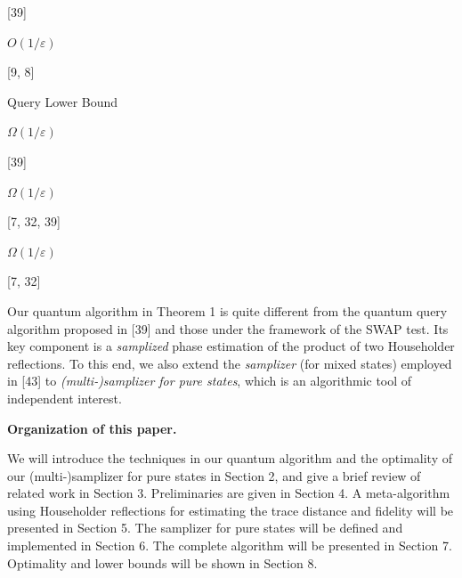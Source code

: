 [39] 
\par



 




$O(1/\varepsilon)$ 
\par


[9, 8] 
\par



 
\par


Query Lower Bound 




$\Omega(1/\varepsilon)$ 
\par


[39] 
\par



 




$\Omega(1/\varepsilon)$ 
\par


[7, 32, 39] 
\par



 




$\Omega(1/\varepsilon)$ 
\par


[7, 32] 
\par



 
\par







Our quantum algorithm in Theorem 1 is quite different from the quantum query algorithm proposed in [39] and those under the framework of the SWAP test. Its key component is a \emph{samplized} phase estimation of the product of two Householder reflections.
To this end, we also extend the \emph{samplizer} (for mixed states) employed in [43] to \emph{(multi-)samplizer for pure states}, which is an algorithmic tool of independent interest.\par




\par\medskip\noindent\textbf{Organization of this paper.}\par




We will introduce the techniques in our quantum algorithm and the optimality of our (multi-)samplizer for pure states in Section 2, and give a brief review of related work in Section 3.
Preliminaries are given in Section 4.
A meta-algorithm using Householder reflections for estimating the trace distance and fidelity will be presented in Section 5.
The samplizer for pure states will be defined and implemented in Section 6.
The complete algorithm will be presented in Section 7.
Optimality and lower bounds will be shown in Section 8.\par






